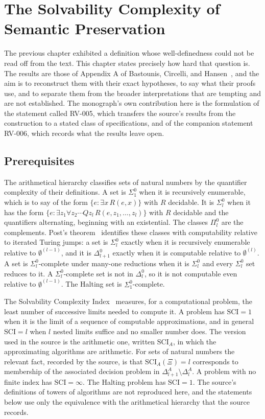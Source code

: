 \chapter{The Solvability Complexity of Semantic Preservation}
\label{ch:sci}

The previous chapter exhibited a definition whose well-definedness could not be read off from the text. This chapter states precisely how hard that question is. The results are those of Appendix A of Bastounis, Circelli, and Hansen~\cite{BCH26}, and the aim is to reconstruct them with their exact hypotheses, to say what their proofs use, and to separate them from the broader interpretations that are tempting and are not established. The monograph's own contribution here is the formulation of the statement called RV-005, which transfers the source's results from the construction to a stated class of specifications, and of the companion statement RV-006, which records what the results leave open.

\section{Prerequisites}

The arithmetical hierarchy classifies sets of natural numbers by the quantifier complexity of their definitions. A set is $\Sigma^0_1$ when it is recursively enumerable, which is to say of the form $\{e : \exists x\, R(e, x)\}$ with $R$ decidable. It is $\Sigma^0_{l}$ when it has the form $\{e : \exists z_1 \forall z_2 \cdots Q z_l\, R(e, z_1, \dots, z_l)\}$ with $R$ decidable and the quantifiers alternating, beginning with an existential. The classes $\Pi^0_l$ are the complements. Post's theorem~\cite{Soare87} identifies these classes with computability relative to iterated Turing jumps: a set is $\Sigma^0_{l}$ exactly when it is recursively enumerable relative to $\emptyset^{(l-1)}$, and it is $\Delta^0_{l+1}$ exactly when it is computable relative to $\emptyset^{(l)}$. A set is $\Sigma^0_l$-complete under many-one reductions when it is $\Sigma^0_l$ and every $\Sigma^0_l$ set reduces to it. A $\Sigma^0_l$-complete set is not in $\Delta^0_l$, so it is not computable even relative to $\emptyset^{(l-1)}$. The Halting set is $\Sigma^0_1$-complete.

The Solvability Complexity Index~\cite{Hansen11} measures, for a computational problem, the least number of successive limits needed to compute it. A problem has $\mathrm{SCI} = 1$ when it is the limit of a sequence of computable approximations, and in general $\mathrm{SCI} = l$ when $l$ nested limits suffice and no smaller number does. The version used in the source is the arithmetic one, written $\mathrm{SCI}_A$, in which the approximating algorithms are arithmetic. For sets of natural numbers the relevant fact, recorded by the source, is that $\mathrm{SCI}_A(\Xi) = l$ corresponds to membership of the associated decision problem in $\Delta^A_{l+1} \setminus \Delta^A_l$. A problem with no finite index has $\mathrm{SCI} = \infty$. The Halting problem has $\mathrm{SCI} = 1$. The source's definitions of towers of algorithms are not reproduced here, and the statements below use only the equivalence with the arithmetical hierarchy that the source records.

